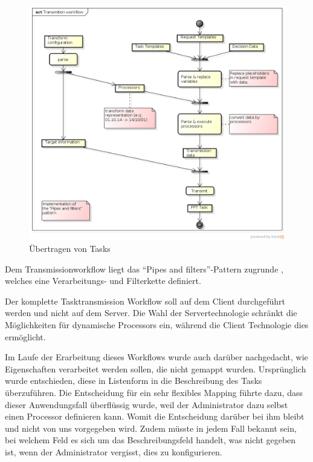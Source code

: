 			\begin{figure}[H]
				\includegraphics[width=\textwidth]{architecture/media/img/transmissionWorkflow.png}
				\centering
				\caption{Übertragen von Tasks}
				\label{fig:transmissionWorkflow}
			\end{figure}
			Dem Transmissionworkflow liegt das "`Pipes and filters"'-Pattern zugrunde
			 \cite{hope_enterprise_2003}, welches eine Verarbeitungs- und Filterkette definiert.
			
			Der komplette Tasktransmission Workflow soll auf dem Client durchgeführt werden und nicht auf dem Server. 
			Die Wahl der Servertechnologie schränkt die Möglichkeiten für dynamische Processors ein, während die Client Technologie dies ermöglicht.
			
			Im Laufe der Erarbeitung dieses Workflows wurde auch darüber nachgedacht, 
			wie Eigenschaften verarbeitet werden sollen, die nicht gemappt wurden. 
			Ursprünglich wurde entschieden, diese in Listenform in die Beschreibung des Tasks
			überzuführen. 
			Die Entscheidung für ein sehr flexibles Mapping führte dazu, 
			dass dieser Anwendungsfall überflüssig wurde, 
			weil der Administrator dazu selbst einen Processor definieren kann.
			Womit die Entscheidung darüber bei ihm bleibt und nicht von uns vorgegeben wird.
			Zudem müsste in jedem Fall bekannt sein, 
			bei welchem Feld es sich um das Beschreibungsfeld handelt, 
			was nicht gegeben ist, wenn der Administrator vergisst, dies zu konfigurieren.
			
